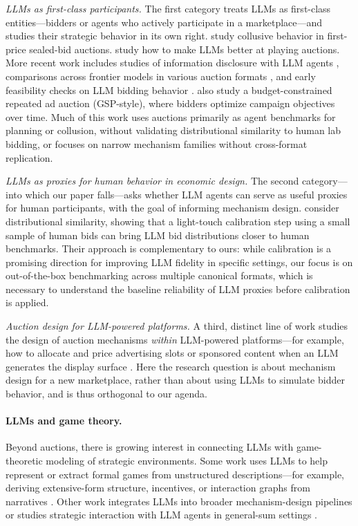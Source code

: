 \emph{LLMs as first-class participants.} The first category treats LLMs as first-class entities---bidders or agents who actively participate in a marketplace---and studies their strategic behavior in its own right. \citet{fish2024algorithmic} study collusive behavior in first-price sealed-bid auctions. \citet{chen2023put} study how to make LLMs better at playing auctions. More recent work includes studies of information disclosure with LLM agents \citep{infobid2025}, comparisons across frontier models in various auction formats \citep{lu2025claude}, and early feasibility checks on LLM bidding behavior \citep{tsuchihashi2023homo}. \citet{auctionnet2024} also study a budget-constrained repeated ad auction (GSP-style), where bidders optimize campaign objectives over time. Much of this work uses auctions primarily as agent benchmarks for planning or collusion, without validating distributional similarity to human lab bidding, or focuses on narrow mechanism families without cross-format replication.

\emph{LLMs as proxies for human behavior in economic design.} The second category---into which our paper falls---asks whether LLM agents can serve as useful proxies for human participants, with the goal of informing mechanism design. \citet{corrigan2025usefulness} consider distributional similarity, showing that a light-touch calibration step using a small sample of human bids can bring LLM bid distributions closer to human benchmarks. Their approach is complementary to ours: while calibration is a promising direction for improving LLM fidelity in specific settings, our focus is on out-of-the-box benchmarking across multiple canonical formats, which is necessary to understand the baseline reliability of LLM proxies before calibration is applied.

\emph{Auction design for LLM-powered platforms.} A third, distinct line of work studies the design of auction mechanisms \emph{within} LLM-powered platforms---for example, how to allocate and price advertising slots or sponsored content when an LLM generates the display surface \citep{duetting2024mechanism, ramage2024adauctions}. Here the research question is about mechanism design for a new marketplace, rather than about using LLMs to simulate bidder behavior, and is thus orthogonal to our agenda.

\paragraph{LLMs and game theory.}
Beyond auctions, there is growing interest in connecting LLMs with game-theoretic modeling of strategic environments. Some work uses LLMs to help represent or extract formal games from unstructured descriptions—for example, deriving extensive-form structure, incentives, or interaction graphs from narratives \citep{daskalakis2024charting}. Other work integrates LLMs into broader mechanism-design pipelines or studies strategic interaction with LLM agents in general-sum settings \citep{duetting2024mechanism,huang2025accelerated,soumalias2025llm, jiang2025incentive, wang2026llm}. 

